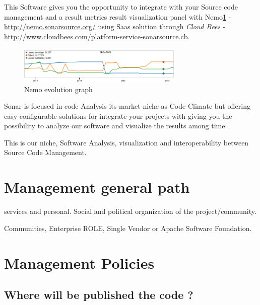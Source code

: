 \documentclass[11pt]{scrartcl}
\begin{document}
\par This Software gives you the opportunity to integrate with your Source code management and a result metrics result visualization panel with Nemo\ref{nemo-evolution} - \url{http://nemo.sonarsource.org/} using Saas solution through \emph{Cloud Bees} - \url{http://www.cloudbees.com/platform-service-sonarsource.cb}.

\begin{figure}[H]
\centering
\includegraphics[width=0.7\textwidth]{nemo-evolution.png}
\caption{Nemo evolution graph}
\label{nemo-evolution}
\end{figure}

\par Sonar is focused in code Analysis its market niche as Code Climate but offering easy configurable solutions for integrate your projects with giving you the possibility to analyze our software and visualize the results among time.

\par This is our niche, Software Analysis, visualization and interoperability between Source Code Management.


\section{Management general path}
\label{sec:management-path}

\par services and personal. Social and political organization of the project/community.

\par Communities, Enterprise ROLE, Single Vendor or Apache Software Foundation.

\section{Management Policies}
\label{sec:management-policies}

\subsection{Where will be published the code ?}
\label{sub:publish-code}
\end{document}
